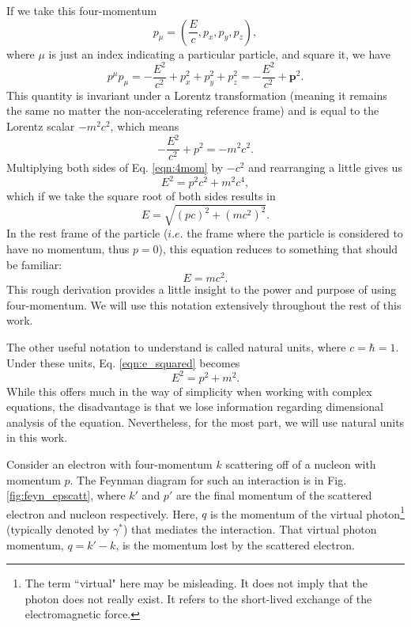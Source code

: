 If we take this four-momentum
\begin{equation}
p_{\mu} = \left( \frac{E}{c}, p_x, p_y, p_z \right),
\end{equation} 
where $\mu$ is just an index indicating a particular particle, and square it, we have
\begin{equation}
p^{\mu}p_{\mu} = -\frac{E^2}{c^2} + p^2_x +p^2_y + p^2_z = -\frac{E^2}{c^2} + \mathbf{p}^2.
\end{equation}
This quantity is invariant under a Lorentz transformation (meaning it remains the same no matter the non-accelerating reference frame) and is equal to the Lorentz scalar $-m^2c^2$, which means 
\begin{equation}
\label{eqn:4mom}
-\frac{E^2}{c^2} + p^2 = -m^2c^2.
\end{equation}
Multiplying both sides of Eq. \ref{eqn:4mom} by $-c^2$ and rearranging a little gives us
\begin{equation}
\label{eqn:e_squared}
E^2 = p^2c^2 + m^2c^4,
\end{equation}
which if we take the square root of both sides results in
\begin{equation}
E=\sqrt{(pc)^2+(mc^2)^2}.
\end{equation}
In the rest frame of the particle ($i.e.$ the frame where the particle is considered to have no momentum, thus $p=0$), this equation reduces to something that should be familiar:
\begin{equation}
E=mc^2.
\end{equation}
This rough derivation provides a little insight to the power and purpose of using four-momentum. We will use this notation extensively throughout the rest of this work. 

The other useful notation to understand is called natural units, where $c=\hbar=1$. Under these units, Eq. \ref{eqn:e_squared} becomes
\begin{equation}
E^2 = p^2 + m^2.
\end{equation}
While this offers much in the way of simplicity when working with complex equations, the disadvantage is that we lose information regarding dimensional analysis of the equation. Nevertheless, for the most part, we will use natural units in this work.

Consider an electron with four-momentum $k$ scattering off of a nucleon with momentum $p$. The Feynman diagram for such an interaction is in Fig. \ref{fig:feyn_epscatt}, where $k'$ and $p'$ are the final momentum of the scattered electron and nucleon respectively. Here, $q$ is the momentum of the virtual photon\footnote{The term ``virtual" here may be misleading. It does not imply that the photon does not really exist. It refers to the short-lived exchange of the electromagnetic force.} (typically denoted by $\gamma^{*}$) that mediates the interaction. That virtual photon momentum, $q=k'-k$, is the momentum lost by the scattered electron.

